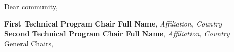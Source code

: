 
Dear community,

\lipsum[3-6]

\vspace{1ex}
\noindent
\textbf{First Technical Program Chair Full Name}, \textit{Affiliation, Country}\\
\textbf{Second Technical Program Chair Full Name}, \textit{Affiliation, Country}\\
General Chairs, \conferenceAcronym\\
